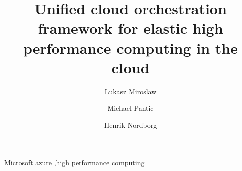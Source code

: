 \documentclass[3p,times]{elsarticle}
\begin{document}
\begin{frontmatter}




\title{Unified cloud orchestration framework for elastic high performance computing in the cloud}


\author[hsr,pwr]{Lukasz Miroslaw}
\author[hsr]{Michael Pantic}
\author[hsr]{Henrik Nordborg}

\address[hsr]{Institute for Energy Technology, Hochschule Rapperswil, Switzerland}
\address[pwr]{Wroclaw University of Technology, Poland}

\begin{abstract}



\end{abstract}

\begin{keyword}
Microsoft azure \sep high performance computing



\end{keyword}

\end{frontmatter}
\end{document}
